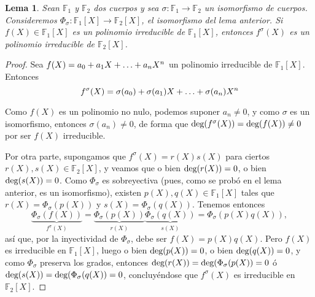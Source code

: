 \documentclass[11pt]{report}
\newcommand{\F}{\mathbb F}
\newtheorem*{lema}{Lema}
\begin{document}
\begin{lema}
    Sean $\F_1$ y $\F_2$ dos cuerpos y sea $\sigma \colon \F_1 \to \F_2$ un isomorfismo de cuerpos. Consideremos $\Phi_\sigma \colon \F_1[X] \to \F_2[X]$, el isomorfismo del lema anterior. Si $f(X) \in \F_1[X]$ es un polinomio irreducible de $\F_1[X]$, entonces $f^\sigma(X)$ es un polinomio irreducible de $\F_2[X]$.  
\end{lema}

\begin{proof}
Sea $f(X)=a_0+a_1X+\mathellipsis+a_nX^n$ un polinomio irreducible de $\F_1[X]$. Entonces
\[f^\sigma(X)=\sigma(a_0)+\sigma(a_1)X+\mathellipsis+\sigma(a_n)X^n\]

Como $f(X)$ es un polinomio no nulo, podemos suponer $a_n \neq 0$, y como $\sigma$ es un isomorfismo, entonces $\sigma(a_n) \neq 0$, de forma que $\textup{deg}(f^\sigma(X)) = \textup{deg}(f(X)) \neq 0$ por ser $f(X)$ irreducible.

\vspace{2mm}

Por otra parte, supongamos que $f^\sigma(X)=r(X) s(X)$ para ciertos $r(X),s(X) \in \F_2[X]$, y veamos que o bien $\textup{deg}(r(X))=0$, o bien $\textup{deg}(s(X))=0$. Como $\Phi_\sigma$ es sobreyectiva (pues, como se probó en el lema anterior, es un isomorfismo), existen $p(X),q(X) \in \F_1[X]$ tales que $r(X)=\Phi_\sigma(p(X))$ y $s(X)=\Phi_\sigma(q(X))$. Tenemos entonces
\[\underbrace{\Phi_\sigma(f(X))}_{f^\sigma(X)} = \underbrace{\Phi_\sigma(p(X))}_{r(X)}\underbrace{\Phi_\sigma(q(X))}_{s(X)} = \Phi_\sigma(p(X)q(X)),\]
así que, por la inyectividad de $\Phi_\sigma$, debe ser $f(X)=p(X)q(X)$. Pero $f(X)$ es irreducible en $\F_1[X]$, luego o bien $\textup{deg}(p(X))=0$, o bien $\textup{deg}(q(X))=0$, y como $\Phi_\sigma$ preserva los grados, entonces $\textup{deg}(r(X))=\textup{deg}(\Phi_\sigma(p(X))=0$ ó $\textup{deg}(s(X))=\textup{deg}(\Phi_\sigma(q(X))=0$, concluyéndose que $f^\sigma(X)$ es irreducible en $\F_2[X]$.
\end{proof}
\end{document}

